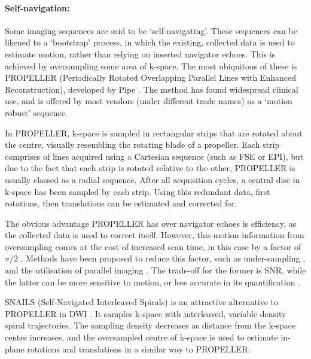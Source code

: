\documentclass[class=article, crop=false]{standalone}
\begin{document}
\paragraph{Self-navigation:}
Some imaging sequences are said to be `self-navigating'. These sequences can be likened to a `bootstrap' process, in which the existing, collected data is used to estimate motion, rather than relying on inserted navigator echoes. This is achieved by oversampling some area of k-space. The most ubiquitous of these is PROPELLER (Periodically Rotated Overlapping Parallel Lines with Enhanced Reconstruction), developed by Pipe \parencite*{Pipe1999}. The method has found widespread clinical use, and is offered by most vendors (under different trade names) as a `motion robust' sequence.
\par
In PROPELLER, k-space is sampled in rectangular strips that are rotated about the centre, visually resembling the rotating blade of a propeller. Each strip comprises of lines acquired using a Cartesian sequence (such as FSE or EPI), but due to the fact that each strip is rotated relative to the other, PROPELLER is usually classed as a radial sequence. After all acquisition cycles, a central disc in k-space has been sampled by each strip. Using this redundant data, first rotations, then translations can be estimated and corrected for.
\par
The obvious advantage PROPELLER has over navigator echoes is efficiency, as the collected data is used to correct itself. However, this motion information from oversampling comes at the cost of increased scan time, in this case by a factor of $\pi/2$ \parencite{Pipe1999}. Methods have been proposed to reduce this factor, such as under-sampling \parencite{Arfanakis2005,Tamhane2012}, and the utilisation of parallel imaging \parencite{Li2011,Skare2008,Chuang2006}. The trade-off for the former is SNR, while the latter can be more sensitive to motion, or less accurate in its quantification \parencite{Tamhane2012}.
\par
SNAILS (Self-Navigated Interleaved Spirals) is an attractive alternative to PROPELLER in DWI \parencite{Liu2004,Liu2005}. It samples k-space with interleaved, variable density spiral trajectories. The sampling density decreases as distance from the k-space centre increases, and the oversampled centre of k-space is used to estimate in-plane rotations and translations in a similar way to PROPELLER.
\par 
\end{document}
